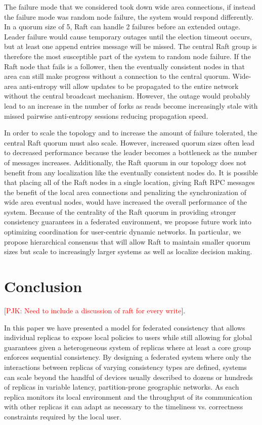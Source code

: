\documentclass[10pt,conference,letterpaper]{IEEEtran}
\newcommand{\todo}[1]{{\textcolor{red}{#1}}}
\newcommand{\pjk}[1]{[\todo{PJK: #1}]}
\begin{document}
The failure mode that we considered took down wide area connections, if instead the failure mode was random node failure, the system would respond differently. In a quorum size of 5, Raft can handle 2 failures before an extended outage. Leader failure would cause temporary outages until the election timeout occurs, but at least one append entries message will be missed. The central Raft group is therefore the most susceptible part of the system to random node failure. If the Raft node that fails is a follower, then the eventually consistent nodes in that area can still make progress without a connection to the central quorum. Wide-area anti-entropy will allow updates to be propagated to the entire network without the central broadcast mechanism. However, the outage would probably lead to an increase in the number of forks as reads become increasingly stale with missed pairwise anti-entropy sessions reducing propagation speed.

In order to scale the topology and to increase the amount of failure tolerated, the central Raft quorum must also scale. However, increased quorum sizes often lead to decreased performance because the leader becomes a bottleneck as the number of messages increases. Additionally, the Raft quorum in our topology does not benefit from any localization like the eventually consistent nodes do. It is possible that placing all of the Raft nodes in a single location, giving Raft RPC messages the benefit of the local area connections and penalizing the synchronization of wide area eventual nodes, would have increased the overall performance of the system. Because of the centrality of the Raft quorum in providing stronger consistency guarantees in a federated environment, we propose future work into optimizing coordination for user-centric dynamic networks. In particular, we propose hierarchical consensus that will allow Raft to maintain smaller quorum sizes but scale to increasingly larger systems as well as localize decision making. 

\section{Conclusion}

\pjk{Need to include a discussion of raft for every write}.

In this paper we have presented a model for federated consistency that allows individual replicas to expose local policies to users while still allowing for global guarantees given a heterogeneous system of replicas where at least a core group enforces sequential consistency. By designing a federated system where only the interactions between replicas of varying consistency types are defined, systems can scale beyond the handful of devices usually described to dozens or hundreds of replicas in variable latency, partition-prone geographic networks. As each replica monitors its local environment and the throughput of its communication with other replicas it can adapt as necessary to the timeliness vs. correctness constraints required by the local user.

% 



\end{document}
